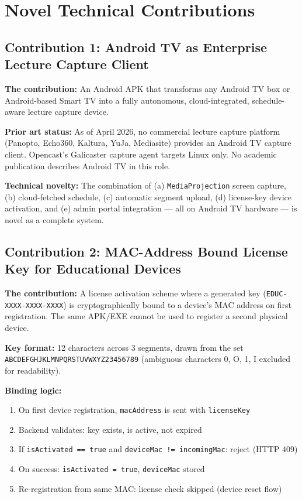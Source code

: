 \documentclass[12pt,a4paper]{article}
\begin{document}
\section{Novel Technical Contributions}

\subsection{Contribution 1: Android TV as Enterprise Lecture Capture Client}

\textbf{The contribution:} An Android APK that transforms any Android TV box or Android-based Smart TV into a fully autonomous, cloud-integrated, schedule-aware lecture capture device.

\textbf{Prior art status:} As of April 2026, no commercial lecture capture platform (Panopto, Echo360, Kaltura, YuJa, Mediasite) provides an Android TV capture client. Opencast's Galicaster capture agent targets Linux only. No academic publication describes Android TV in this role.

\textbf{Technical novelty:} The combination of (a) \texttt{MediaProjection} screen capture, (b) cloud-fetched schedule, (c) automatic segment upload, (d) license-key device activation, and (e) admin portal integration — all on Android TV hardware — is novel as a complete system.

\subsection{Contribution 2: MAC-Address Bound License Key for Educational Devices}

\textbf{The contribution:} A license activation scheme where a generated key (\texttt{EDUC-XXXX-XXXX-XXXX}) is cryptographically bound to a device's MAC address on first registration. The same APK/EXE cannot be used to register a second physical device.

\textbf{Key format:} 12 characters across 3 segments, drawn from the set \texttt{ABCDEFGHJKLMNPQRSTUVWXYZ23456789} (ambiguous characters 0, O, 1, I excluded for readability).

\textbf{Binding logic:}
\begin{enumerate}
    \item On first device registration, \texttt{macAddress} is sent with \texttt{licenseKey}
    \item Backend validates: key exists, is active, not expired
    \item If \texttt{isActivated == true} and \texttt{deviceMac != incomingMac}: reject (HTTP 409)
    \item On success: \texttt{isActivated = true}, \texttt{deviceMac} stored
    \item Re-registration from same MAC: license check skipped (device reset flow)
\end{enumerate}
\end{document}
